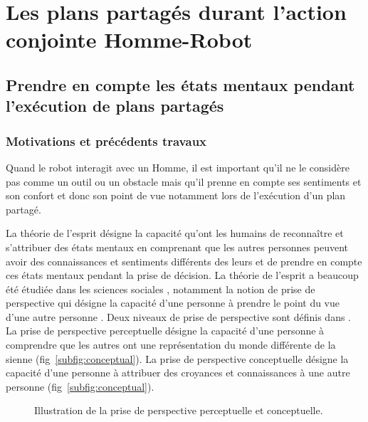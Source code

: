 \documentclass[english,a4paper,11pt,twoside]{StyleThese}
\begin{document}
\newpage
\section{Les plans partagés durant l'action conjointe Homme-Robot}

\subsection{Prendre en compte les états mentaux pendant l'exécution de plans partagés}

\subsubsection{Motivations et précédents travaux}

Quand le robot interagit avec un Homme, il est important qu'il ne le considère pas comme un outil ou un obstacle mais qu'il prenne en compte ses sentiments et son confort et donc son point de vue notamment lors de l'exécution d'un plan partagé.

La théorie de l'esprit désigne la capacité qu'ont les humains de reconnaître et s'attribuer des états mentaux en comprenant que les autres personnes peuvent avoir des connaissances et sentiments différents des leurs et de prendre en compte ces états mentaux pendant la prise de décision. La théorie de l'esprit a beaucoup été étudiée dans les sciences sociales \cite{baron1985does, premack1978does}, notamment la notion de prise de perspective qui désigne la capacité d'une personne à prendre le point du vue d'une autre personne \cite{tversky1999speakers, flavell1992perspectives}. Deux niveaux de prise de perspective sont définis dans \cite{flavell1977development}. La prise de perspective perceptuelle désigne la capacité d'une personne à comprendre que les autres ont une représentation du monde différente de la sienne (fig~\ref{subfig:conceptual}). La prise de perspective conceptuelle désigne la capacité d'une personne à attribuer des croyances et connaissances à une autre personne (fig~\ref{subfig:conceptual}).

\begin{figure}[!h]
    \centering
    \hfill
    \caption{Illustration de la prise de perspective perceptuelle et conceptuelle.}
\end{figure}
\end{document}
